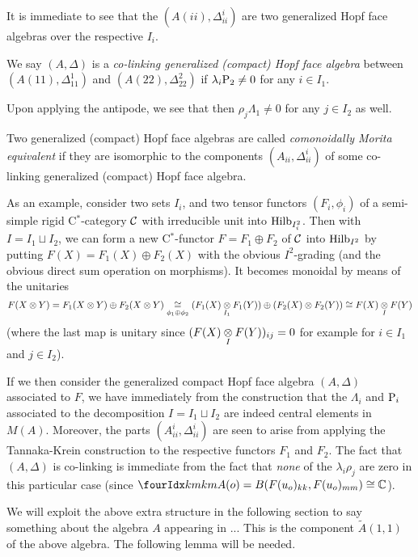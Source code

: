 It is immediate to see that the $(A(ii),\Delta_{ii}^i)$ are two generalized Hopf face algebras over the respective $I_i$.

\begin{Def} We say $(A,\Delta)$ is a \emph{co-linking generalized (compact) Hopf face algebra} between $(A(11),\Delta_{11}^1)$ and $(A(22),\Delta_{22}^2)$ if $\lambda_i\mathrm{P}_2\neq 0$ for any $i\in I_1$.
\end{Def}

Upon applying the antipode, we see that then $\rho_j\Lambda_1\neq 0$ for any $j\in I_2$ as well.

\begin{Def} Two generalized (compact) Hopf face algebras are called \emph{comonoidally Morita equivalent} if they are isomorphic to the components $(A_{ii},\Delta_{ii}^i)$ of some co-linking generalized (compact) Hopf face algebra.\end{Def}

As an example, consider two sets $I_i$, and two tensor functors $(F_i,\phi_i)$ of a semi-simple rigid C$^*$-category $\mathcal{C}$ with irreducible unit into $\mathrm{Hilb}_{I_i^2}$. Then with $I= I_1\sqcup I_2$, we can form a new C$^*$-functor $F=F_1\oplus F_2$ of $\mathcal{C}$ into $\mathrm{Hilb}_{I^2}$ by putting $F(X) = F_1(X)\oplus F_2(X)$ with the obvious $I^2$-grading (and the obvious direct sum operation on morphisms). It becomes monoidal by means of the unitaries \[F(X\otimes Y) = F_1(X\otimes Y)\oplus F_2(X\otimes Y) \underset{\phi_1\oplus \phi_2}{\cong} (F_1(X)\underset{I_1}{\otimes} F_1(Y)) \oplus (F_2(X)\otimes F_2(Y)) \cong F(X)\underset{I}{\otimes} F(Y)\] (where the last map is unitary since $(F(X)\underset{I}{\otimes} F(Y))_{ij}=0$ for example for $i\in I_1$ and $j\in I_2$).

If we then consider the generalized compact Hopf face algebra $(A,\Delta)$ associated to $F$, we have immediately from the construction that the $\Lambda_i$ and $\mathrm{P}_i$ associated to the decomposition $I = I_1\sqcup I_2$ are indeed central elements in $M(A)$. Moreover, the parts $(A_{ii}^i,\Delta_{ii}^i)$ are seen to arise from applying the Tannaka-Krein construction to the respective functors $F_1$ and $F_2$. The fact that $(A,\Delta)$ is co-linking is immediate from the fact that \emph{none} of the $\lambda_i\rho_j$ are zero in this particular case (since $\Gr{A}{k}{k}{m}{m}(o) = B(F(u_o)_{kk},F(u_o)_{mm}) \cong \C$).

We will exploit the above extra structure in the following section to say something about the algebra $A$ appearing in ... This is the component $\tilde{A}(1,1)$ of the above algebra. The following lemma will be needed.


